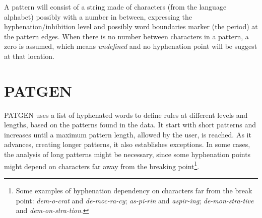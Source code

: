 \documentclass{article}
\begin{document}
A pattern will consist of a string made of characters (from the language
alphabet) possibly with a number in between, expressing the
hyphenation/inhibition level and possibly word boundaries marker (the period)
at the pattern edges. When there is no number between characters in a pattern,
a zero is assumed, which means \emph{undefined} and no hyphenation point will
be suggest at that location.



\section{PATGEN}\label{sec-patgen}
PATGEN uses a list of hyphenated words to define rules at different
levels and lengths, based on the patterns found in the data. It start with
short patterns and increases until a maximum pattern length, allowed by the
user, is reached. As it advances, creating longer patterns, it also establishes
exceptions. In some cases, the analysis of long patterns might be necessary,
since some hyphenation points might depend on characters far away from the
breaking point\footnote{Some examples of hyphenation dependency on characters
far from the break point: \emph{dem-o-crat} and \emph{de-moc-ra-cy};
\emph{as-pi-rin} and \emph{aspir-ing}; \emph{de-mon-stra-tive} and
\emph{dem-on-stra-tion}.}.
\end{document}
